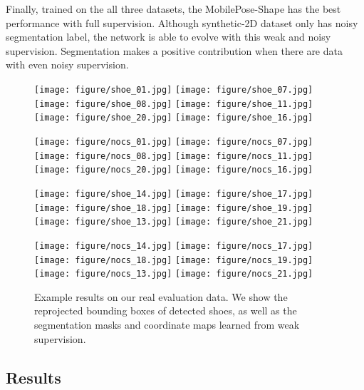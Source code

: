 \documentclass[runningheads]{llncs}
\begin{document}
Finally, trained on the all three datasets, the MobilePose-Shape has the best performance with full supervision. Although synthetic-2D dataset only has noisy segmentation label, the network is able to evolve with this weak and noisy supervision. Segmentation makes a positive contribution when there are data with even noisy supervision.

\begin{figure}[t]
    \centering
    \texttt{[image: figure/shoe\_01.jpg]}
    \texttt{[image: figure/shoe\_07.jpg]}
    \texttt{[image: figure/shoe\_08.jpg]}
    \texttt{[image: figure/shoe\_11.jpg]}
    \texttt{[image: figure/shoe\_20.jpg]}
    \texttt{[image: figure/shoe\_16.jpg]}
    
    \texttt{[image: figure/nocs\_01.jpg]}
    \texttt{[image: figure/nocs\_07.jpg]}
    \texttt{[image: figure/nocs\_08.jpg]}
    \texttt{[image: figure/nocs\_11.jpg]}
    \texttt{[image: figure/nocs\_20.jpg]}
    \texttt{[image: figure/nocs\_16.jpg]}
    
    \texttt{[image: figure/shoe\_14.jpg]}
    \texttt{[image: figure/shoe\_17.jpg]}
    \texttt{[image: figure/shoe\_18.jpg]}
    \texttt{[image: figure/shoe\_19.jpg]}
    \texttt{[image: figure/shoe\_13.jpg]}
    \texttt{[image: figure/shoe\_21.jpg]}
    
    \texttt{[image: figure/nocs\_14.jpg]}
    \texttt{[image: figure/nocs\_17.jpg]}
    \texttt{[image: figure/nocs\_18.jpg]}
    \texttt{[image: figure/nocs\_19.jpg]}
    \texttt{[image: figure/nocs\_13.jpg]}
    \texttt{[image: figure/nocs\_21.jpg]}
    \caption{Example results on our real evaluation data. We show the reprojected bounding boxes of detected shoes, as well as the segmentation masks and coordinate maps learned from weak supervision.}
    \label{fig:result}
\end{figure}

\subsection{Results}
\end{document}
